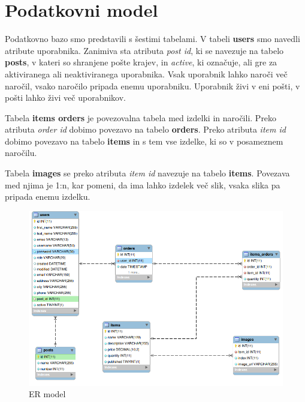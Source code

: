 \documentclass[a4paper,12pt]{report}
\begin{document}
\chapter{Podatkovni model}


Podatkovno bazo smo predstavili s šestimi tabelami. V tabeli {\bfseries users} smo navedli atribute uporabnika. Zanimiva sta atributa {\it post id}, ki se navezuje na tabelo {\bfseries posts}, v kateri so shranjene pošte krajev, in {\it active}, ki označuje, ali gre za aktiviranega ali neaktiviranega uporabnika. Vsak uporabnik lahko naroči več naročil, vsako naročilo pripada enemu uporabniku. Uporabnik živi v eni pošti, v pošti lahko živi več uporabnikov.

Tabela {\bfseries items orders} je povezovalna tabela med izdelki in naročili. Preko atributa {\it order id} dobimo povezavo na tabelo {\bfseries orders}. Preko atributa {\it item id} dobimo povezavo na tabelo {\bfseries items} in s tem vse izdelke, ki so v posameznem naročilu.

Tabela {\bfseries images} se preko atributa {\it item id} navezuje na tabelo {\bfseries items}. Povezava med njima je 1:n, kar pomeni, da ima lahko izdelek več slik, vsaka slika pa pripada enemu izdelku.

\begin{figure}[htb]
	\centering
	\includegraphics[width=13cm]{img/ER-model.png}
	\caption{ER model}
\label{fig:4}
\end{figure}
\end{document}
